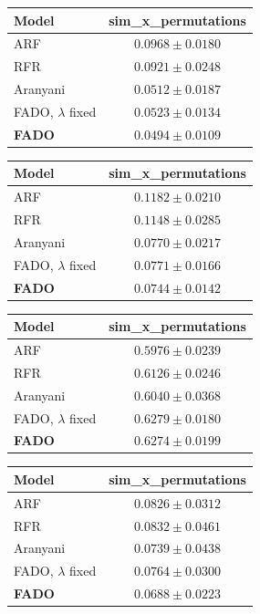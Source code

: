 \begin{tabular}{lc}
\toprule
\textbf{Model} & sim\_x\_permutations \\
\midrule
ARF & $0.0968 \pm 0.0180$ \\
RFR & $0.0921 \pm 0.0248$ \\
Aranyani & $0.0512 \pm 0.0187$ \\
FADO, $\lambda$ fixed & $0.0523 \pm 0.0134$ \\
\textbf{FADO} & $0.0494 \pm 0.0109$ \\
\bottomrule
\end{tabular}

\begin{tabular}{lc}
\toprule
\textbf{Model} & sim\_x\_permutations \\
\midrule
ARF & $0.1182 \pm 0.0210$ \\
RFR & $0.1148 \pm 0.0285$ \\
Aranyani & $0.0770 \pm 0.0217$ \\
FADO, $\lambda$ fixed & $0.0771 \pm 0.0166$ \\
\textbf{FADO} & $0.0744 \pm 0.0142$ \\
\bottomrule
\end{tabular}

\begin{tabular}{lc}
\toprule
\textbf{Model} & sim\_x\_permutations \\
\midrule
ARF & $0.5976 \pm 0.0239$ \\
RFR & $0.6126 \pm 0.0246$ \\
Aranyani & $0.6040 \pm 0.0368$ \\
FADO, $\lambda$ fixed & $0.6279 \pm 0.0180$ \\
\textbf{FADO} & $0.6274 \pm 0.0199$ \\
\bottomrule
\end{tabular}

\begin{tabular}{lc}
\toprule
\textbf{Model} & sim\_x\_permutations \\
\midrule
ARF & $0.0826 \pm 0.0312$ \\
RFR & $0.0832 \pm 0.0461$ \\
Aranyani & $0.0739 \pm 0.0438$ \\
FADO, $\lambda$ fixed & $0.0764 \pm 0.0300$ \\
\textbf{FADO} & $0.0688 \pm 0.0223$ \\
\bottomrule
\end{tabular}

